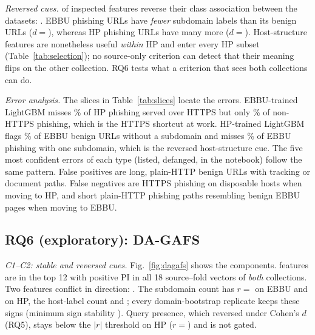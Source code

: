 \textit{Reversed cues.}  of  inspected features reverse their class association between the datasets: . EBBU phishing URLs have \emph{fewer} subdomain labels than its benign URLs ($d{=}$), whereas HP phishing URLs have many more ($d{=}$). Host-structure features are nonetheless useful \emph{within} HP and enter every HP subset (Table~\ref{tab:selection}); no source-only criterion can detect that their meaning flips on the other collection. RQ6 tests what a criterion that sees both collections can do.

\textit{Error analysis.} The slices in Table~\ref{tab:slices} locate the errors. EBBU-trained LightGBM misses \% of HP phishing served over HTTPS but only \% of non-HTTPS phishing, which is the HTTPS shortcut at work. HP-trained LightGBM flags \% of EBBU benign URLs without a subdomain and misses \% of EBBU phishing with one subdomain, which is the reversed host-structure cue. The five most confident errors of each type (listed, defanged, in the notebook) follow the same pattern. False positives are long, plain-HTTP benign URLs with tracking or document paths. False negatives are HTTPS phishing on disposable hosts when moving to HP, and short plain-HTTP phishing paths resembling benign EBBU pages when moving to EBBU.

\begin{table}[t]
\caption{Error rates of the seed-17 frozen ALL LightGBM models on target VAL by pre-defined slice.}
\label{tab:slices}
\centering\scriptsize\setlength{\tabcolsep}{3pt}

\end{table}




\subsection{RQ6 (exploratory): DA-GAFS}\label{sec:rq6}
\textit{C1--C2: stable and reversed cues.} Fig.~\ref{fig:dagafs} shows the components.  features are in the top 12 with positive PI in all 18 source--fold vectors of \emph{both} collections. Two features conflict in direction: . The subdomain count has $r{=}$ on EBBU and  on HP, the host-label count  and ; every domain-bootstrap replicate keeps these signs (minimum sign stability ). Query presence, which reversed under Cohen's $d$ (RQ5), stays below the $|r|$ threshold on HP ($r{=}$) and is not gated.

